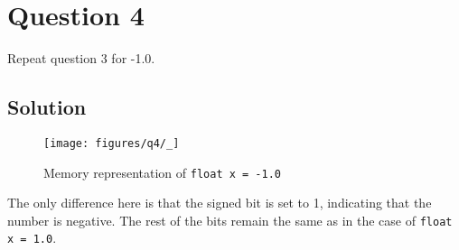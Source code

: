 \section*{Question 4}

Repeat question 3 for -1.0.

\subsection*{Solution}

\begin{figure*}[htb]
    \centering
    \texttt{[image: figures/q4/\_]}
    \caption{
        Memory representation of \texttt{float x = -1.0}
    }
\end{figure*}

The only difference here is that the signed bit is set to 1, indicating that the number is negative. The rest of the bits remain the same as in the case of \texttt{float x = 1.0}.
